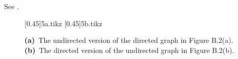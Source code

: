 \exercise
See .
\begin{figure}[htb]
    \subcaptionbox{\label{fig:B.4-5a}}[0.45\textwidth]{{5a.tikz}}
    \subcaptionbox{\label{fig:B.4-5b}}[0.45\textwidth]{{5b.tikz}}
    \caption{\textbf{(a)}\, The undirected version of the directed graph in Figure B.2(a).\,
    \textbf{(b)}\, The directed version of the undirected graph in Figure B.2(b).} \label{fig:B.4-5}
\end{figure}
